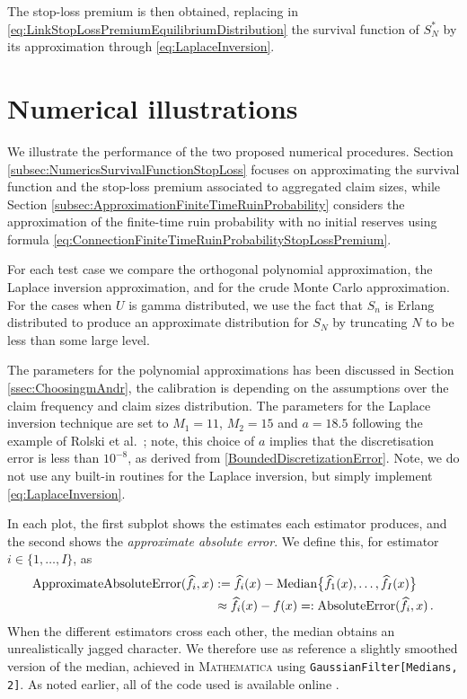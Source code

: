 The stop-loss premium is then obtained, replacing in \eqref{eq:LinkStopLossPremiumEquilibriumDistribution} the survival function of $S_N^{\ast}$ by its approximation through \eqref{eq:LaplaceInversion}.

\section{Numerical illustrations}\label{sec:NumericalIllustrations}

We illustrate the performance of the two proposed numerical procedures. Section \ref{subsec:NumericsSurvivalFunctionStopLoss} focuses on approximating the survival function and the stop-loss premium associated to aggregated claim sizes, while Section \ref{subsec:ApproximationFiniteTimeRuinProbability} considers the approximation of the finite-time ruin probability with no initial reserves using formula \eqref{eq:ConnectionFiniteTimeRuinProbabilityStopLossPremium}.

For each test case we compare the orthogonal polynomial approximation, the Laplace inversion approximation, and for the crude Monte Carlo approximation. For the cases when $U$ is gamma distributed, we use the fact that $S_n$ is Erlang distributed to produce an approximate distribution for $S_N$ by truncating $N$ to be less than some large level.

The parameters for the polynomial approximations has been discussed in Section \ref{ssec:ChoosingmAndr}, the calibration is depending on the assumptions over the claim frequency and claim sizes distribution.
The parameters for the Laplace inversion technique are set to $M_1=11$, $M_2=15$ and $a=18.5$ following the example of Rolski et al.\ \cite[Chapter 5, Section 5]{RoScScTe08}; note, this choice of $a$ implies that the discretisation error is less than $10^{-8}$, as derived from \eqref{BoundedDiscretizationError}. Note, we do not use any built-in routines for the Laplace inversion, but simply implement \eqref{eq:LaplaceInversion}.

In each plot, the first subplot shows the estimates each estimator produces, and the second shows the \emph{approximate absolute error}. We define this, for estimator $i \in \{1,\dots,I\}$, as
\begin{align*}
\text{ApproximateAbsoluteError}( \widehat{f}_i, x )
&:= \widehat{f}_i(x)- \text{Median}\big\{ \widehat{f}_1(x),\dots,\widehat{f}_I(x) \big\} \\
&\approx \widehat{f}_i(x)-f(x) =: \text{AbsoluteError}( \widehat{f}_i, x ) \,.
\end{align*}
When the different estimators cross each other, the median obtains an unrealistically jagged character. We therefore use as reference a slightly smoothed version of the median, achieved in \textsc{Mathematica} using \texttt{GaussianFilter[Medians, 2]}. As noted earlier, all of the code used is available online \cite{StoplossCode}.

